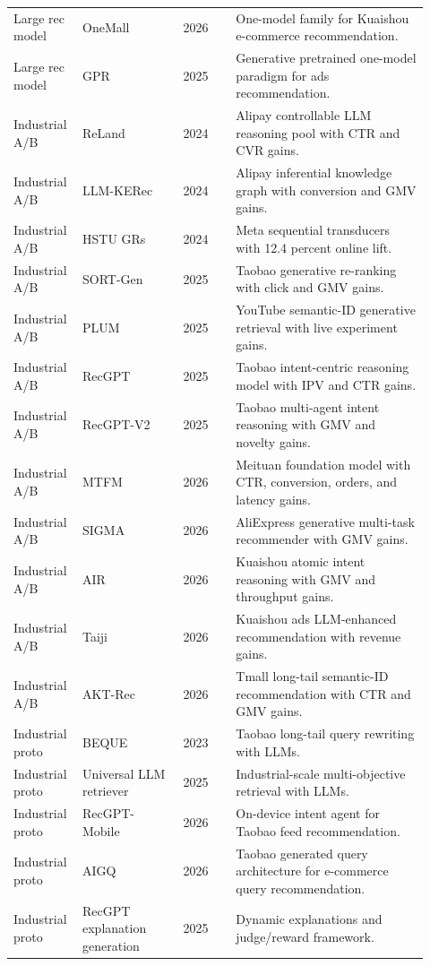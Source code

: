 \documentclass[11pt]{article}
\begin{document}
\begin{longtable}{@{}p{0.13\linewidth}p{0.23\linewidth}p{0.12\linewidth}p{0.44\linewidth}@{}}
Large rec model & OneMall & 2026 & One-model family for Kuaishou e-commerce recommendation.\\
Large rec model & GPR & 2025 & Generative pretrained one-model paradigm for ads recommendation.\\
Industrial A/B & ReLand & 2024 & Alipay controllable LLM reasoning pool with CTR and CVR gains.\\
Industrial A/B & LLM-KERec & 2024 & Alipay inferential knowledge graph with conversion and GMV gains.\\
Industrial A/B & HSTU GRs & 2024 & Meta sequential transducers with 12.4 percent online lift.\\
Industrial A/B & SORT-Gen & 2025 & Taobao generative re-ranking with click and GMV gains.\\
Industrial A/B & PLUM & 2025 & YouTube semantic-ID generative retrieval with live experiment gains.\\
Industrial A/B & RecGPT & 2025 & Taobao intent-centric reasoning model with IPV and CTR gains.\\
Industrial A/B & RecGPT-V2 & 2025 & Taobao multi-agent intent reasoning with GMV and novelty gains.\\
Industrial A/B & MTFM & 2026 & Meituan foundation model with CTR, conversion, orders, and latency gains.\\
Industrial A/B & SIGMA & 2026 & AliExpress generative multi-task recommender with GMV gains.\\
Industrial A/B & AIR & 2026 & Kuaishou atomic intent reasoning with GMV and throughput gains.\\
Industrial A/B & Taiji & 2026 & Kuaishou ads LLM-enhanced recommendation with revenue gains.\\
Industrial A/B & AKT-Rec & 2026 & Tmall long-tail semantic-ID recommendation with CTR and GMV gains.\\
Industrial proto & BEQUE & 2023 & Taobao long-tail query rewriting with LLMs.\\
Industrial proto & Universal LLM retriever & 2025 & Industrial-scale multi-objective retrieval with LLMs.\\
Industrial proto & RecGPT-Mobile & 2026 & On-device intent agent for Taobao feed recommendation.\\
Industrial proto & AIGQ & 2026 & Taobao generated query architecture for e-commerce query recommendation.\\
Industrial proto & RecGPT explanation generation & 2025 & Dynamic explanations and judge/reward framework.\\

\end{longtable}
\end{document}
